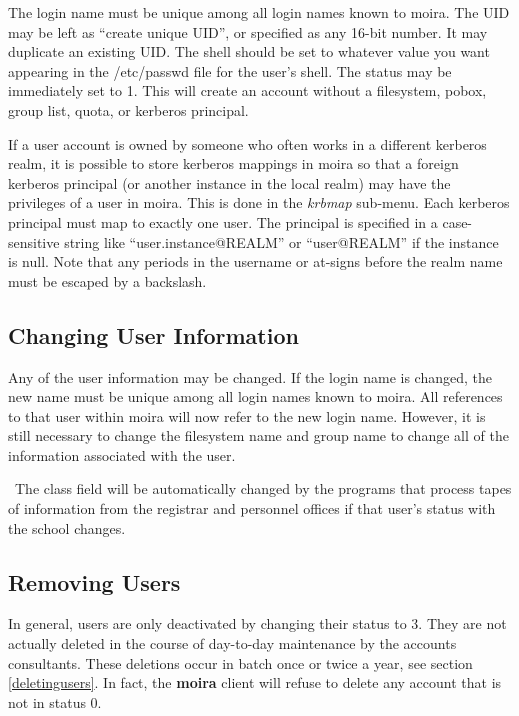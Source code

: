 The login name must be unique among all login names known to moira.
The UID may be left as ``create unique UID'', or specified as any 16-bit
number.  It may duplicate an existing UID.  The shell should be set to
whatever value you want appearing in the /etc/passwd file for the
user's shell.  The status may be immediately set to 1.  This will
create an account without a filesystem, pobox, group list, quota, or
kerberos principal.

If a user account is owned by someone who often works in a different
kerberos realm, it is possible to store kerberos mappings in moira so
that a foreign kerberos principal (or another instance in the local
realm) may have the privileges of a user in moira.  This is done in
the {\em krbmap} sub-menu.  Each kerberos principal must map to exactly
one user.  The principal is specified in a case-sensitive string like
``user.instance@REALM'' or ``user@REALM'' if the instance is null.
Note that any periods in the username or at-signs before the realm
name must be escaped by a backslash.

\subsection{Changing User Information}

Any of the user information may be changed.  If the login name is
changed, the new name must be unique among all login names known to
moira.  All references to that user within moira will now refer to the
new login name.  However, it is still necessary to change the
filesystem name and group name to change all of the information
associated with the user.

\athena\ The class field will be automatically changed by the programs that
process tapes of information from the registrar and personnel offices
if that user's status with the school changes.

\subsection{Removing Users}

In general, users are only deactivated by changing their status to 3.
They are not actually deleted in the course of day-to-day maintenance
by the accounts consultants.  These deletions occur in batch once or
twice a year, see section \ref{deletingusers}.  In fact, the
{\bf moira} client will refuse to delete any account that is not in
status 0.

